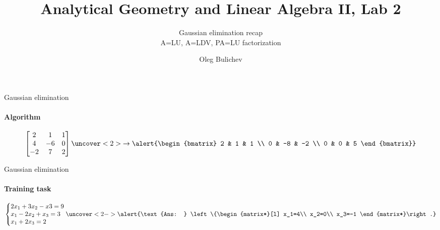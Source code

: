 \documentclass[aspectratio=169]{beamer}
\title[AGLA2]{Analytical Geometry and Linear Algebra II, Lab 2} %
\subtitle{Gaussian elimination recap\\
          A=LU, A=LDV, PA=LU factorization} %
\author{Oleg Bulichev}
\newcommand{\fbckg}[1]{\usebackgroundtemplate{\texttt{[image: \#1]}}}%
\begin{document}
\fbckg{fibeamer/figs/title_page.png}

\fbckg{fibeamer/figs/common.png}



\begin{frame}[t]{Gaussian elimination}
    \framesubtitle{Algorithm}
    \Large
    \begin{equation*}
        \begin{bmatrix}
            2  & 1  & 1 \\
            4  & -6 & 0 \\
            -2 & 7  & 2
        \end{bmatrix}
        \uncover<2>{\rightarrow \alert{\begin{bmatrix}
                    2 & 1  & 1  \\
                    0 & -8 & -2 \\
                    0 & 0  & 5
                \end{bmatrix}}}
    \end{equation*}
\end{frame}

\begin{frame}[t]{Gaussian elimination}
    \framesubtitle{Training task}
    \begin{equation*}
        \left\{\begin{matrix*}[l]
            2x_1+3x_2-x3=9\\
            x_1-2x_2+x_3=3\\
            x_1+2x_3=2
        \end{matrix*}\right.
        \uncover<2->{\alert{\text{Ans: } \left\{\begin{matrix*}[l]
                    x_1=4\\
                    x_2=0\\
                    x_3=-1
                \end{matrix*}\right.}}
    \end{equation*}
\end{frame}
\end{document}
